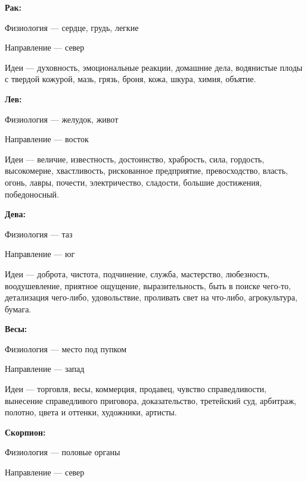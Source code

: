 \begin{myenum}[topsep=0]
\begin{mydescr}
		\end{mydescr}
	\item \textbf{Рак:}
		\begin{mydescr}
			\item[Физиология] --- сердце, грудь, легкие
			\item[Направление] --- север
			\item[Идеи] --- духовность, эмоциональные реакции, домашние дела, водянистые плоды с твердой кожурой, мазь, грязь, броня, кожа, шкура, химия, объятие.
		\end{mydescr}
	\item \textbf{Лев:}
		\begin{mydescr}
			\item[Физиология] --- желудок, живот
			\item[Направление] --- восток
			\item[Идеи] --- величие, известность, достоинство, храбрость, сила, гордость, высокомерие, хвастливость, рискованное предприятие, превосходство, власть, огонь, лавры, почести, электричество, сладости, большие достижения, победоносный.
		\end{mydescr}
	\item \textbf{Дева:}
		\begin{mydescr}
			\item[Физиология] --- таз
			\item[Направление] --- юг
			\item[Идеи] --- доброта, чистота, подчинение, служба, мастерство, любезность, воодушевление, приятное ощущение, выразительность, быть в поиске чего-то, детализация чего-либо, удовольствие, проливать свет на что-либо, агрокультура, бумага.
		\end{mydescr}
	\item \textbf{Весы:}
		\begin{mydescr}
			\item[Физиология] --- место под пупком
			\item[Направление] --- запад
			\item[Идеи] --- торговля, весы, коммерция, продавец, чувство справедливости, вынесение справедливого приговора, доказательство, третейский суд, арбитраж, полотно, цвета и оттенки, художники, артисты.
		\end{mydescr}
	\item \textbf{Скорпион:}
		\begin{mydescr}
			\item[Физиология] --- половые органы
			\item[Направление] --- север

\end{mydescr}
\end{myenum}
